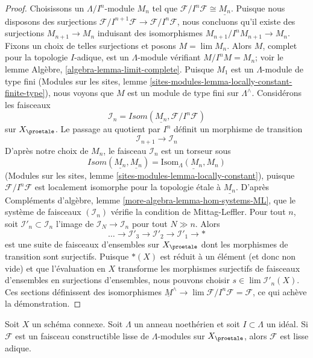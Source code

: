 \begin{proof}
Choisissons un $\Lambda/I^n$-module $M_n$ tel que
$\mathcal{F}/I^n\mathcal{F} \cong \underline{M_n}$.
Puisque nous disposons des surjections
$\mathcal{F}/I^{n + 1}\mathcal{F} \to \mathcal{F}/I^n\mathcal{F}$,
nous concluons qu'il existe des
surjections $M_{n + 1} \to M_n$ induisant des isomorphismes
$M_{n + 1}/I^nM_{n + 1} \to M_n$. Fixons un choix de telles surjections
et posons $M = \lim M_n$. Alors $M$, complet pour la topologie $I$-adique,
est un $\Lambda$-module vérifiant $M/I^nM = M_n$; voir le
lemme Algèbre, \ref{algebra-lemma-limit-complete}.
Puisque $M_1$ est un $\Lambda$-module de type fini
(Modules sur les sites, lemme
\ref{sites-modules-lemma-locally-constant-finite-type}),
nous voyons que $M$ est un module de type fini sur $\Lambda^\wedge$.
Considérons les faisceaux
$$
\mathcal{I}_n = \mathit{Isom}(\underline{M_n}, \mathcal{F}/I^n\mathcal{F})
$$
sur $X_\proetale$. Le passage au quotient par $I^n$ définit un morphisme de transition
$$
\mathcal{I}_{n + 1} \longrightarrow \mathcal{I}_n
$$
D'après notre choix de $M_n$, le faisceau $\mathcal{I}_n$ est un torseur sous
$$
\mathit{Isom}(\underline{M_n}, \underline{M_n}) =
\underline{\text{Isom}_\Lambda(M_n, M_n)}
$$
(Modules sur les sites, lemme \ref{sites-modules-lemma-locally-constant}),
puisque $\mathcal{F}/I^n\mathcal{F}$ est localement isomorphe pour la topologie \'etale
à $\underline{M_n}$. D'après
Compléments d'algèbre, lemme \ref{more-algebra-lemma-hom-systems-ML},
que le système de faisceaux $(\mathcal{I}_n)$ vérifie la condition de Mittag-Leffler.
Pour tout $n$, soit $\mathcal{I}'_n \subset \mathcal{I}_n$ l'image
de $\mathcal{I}_N \to \mathcal{I}_n$ pour tout $N \gg n$.
Alors
$$
\ldots \to \mathcal{I}'_3 \to \mathcal{I}'_2 \to \mathcal{I}'_1 \to *
$$
est une suite de faisceaux d'ensembles sur $X_\proetale$ dont les morphismes de
transition sont surjectifs. Puisque $*(X)$ est réduit à un élément (et donc non vide)
et que l'évaluation en $X$ transforme les morphismes surjectifs de faisceaux d'ensembles
en surjections d'ensembles, nous pouvons choisir
$s \in \lim \mathcal{I}'_n(X)$. Ces sections définissent des isomorphismes
$\underline{M}^\wedge \to \lim \mathcal{F}/I^n\mathcal{F} = \mathcal{F}$,
ce qui achève la démonstration.
\end{proof}

\begin{lemma}
\label{lemma-connected-lisse}
Soit $X$ un schéma connexe. Soit $\Lambda$ un anneau noethérien et soit
$I \subset \Lambda$ un idéal. Si $\mathcal{F}$ est un faisceau constructible lisse
de $\Lambda$-modules sur $X_\proetale$, alors $\mathcal{F}$
est lisse adique.
\end{lemma}

